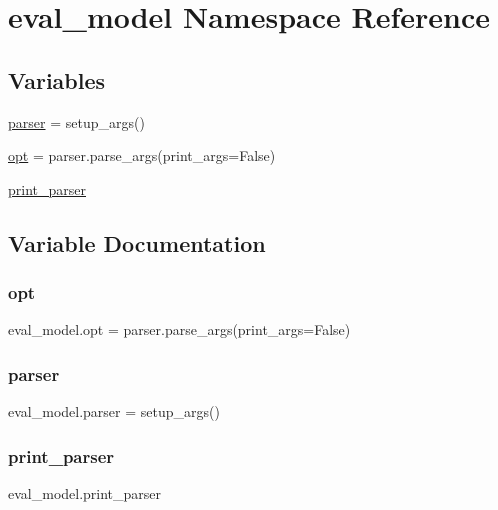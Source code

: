 \hypertarget{namespaceeval__model}{}\section{eval\+\_\+model Namespace Reference}
\label{namespaceeval__model}
\subsection*{Variables}
\begin{DoxyCompactItemize}
\item 
\hyperlink{namespaceeval__model_af40266de0e7152af5dc5a835a47a16a0}{parser} = setup\+\_\+args()
\item 
\hyperlink{namespaceeval__model_a748426649b07d37488ff05ef80081f2c}{opt} = parser.\+parse\+\_\+args(print\+\_\+args=False)
\item 
\hyperlink{namespaceeval__model_a09dddb88f4842a88e26a0961b1c8a5e3}{print\+\_\+parser}
\end{DoxyCompactItemize}


\subsection{Variable Documentation}
\mbox{\label{namespaceeval__model_a748426649b07d37488ff05ef80081f2c}} 
\subsubsection{\texorpdfstring{opt}{opt}}
{\footnotesize\ttfamily eval\+\_\+model.\+opt = parser.\+parse\+\_\+args(print\+\_\+args=False)}

\mbox{\label{namespaceeval__model_af40266de0e7152af5dc5a835a47a16a0}} 
\subsubsection{\texorpdfstring{parser}{parser}}
{\footnotesize\ttfamily eval\+\_\+model.\+parser = setup\+\_\+args()}

\mbox{\label{namespaceeval__model_a09dddb88f4842a88e26a0961b1c8a5e3}} 
\subsubsection{\texorpdfstring{print\+\_\+parser}{print\_parser}}
{\footnotesize\ttfamily eval\+\_\+model.\+print\+\_\+parser}

